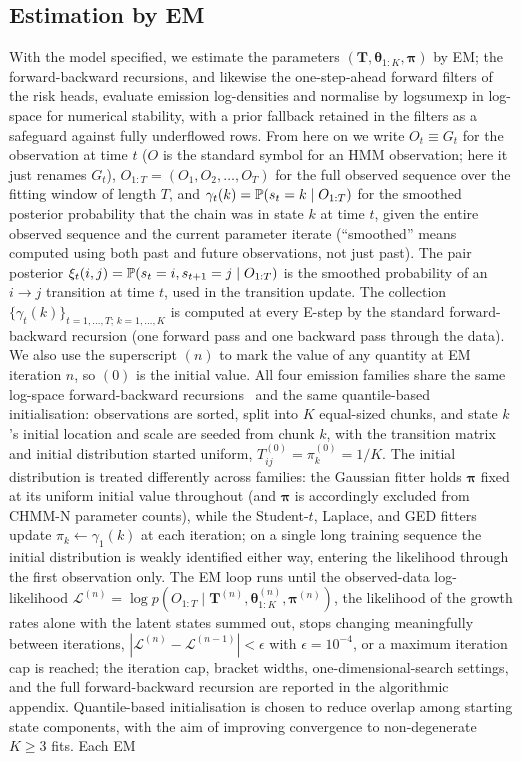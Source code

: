 \subsection{Estimation by EM}
\label{sec:estimation}

With the model specified, we estimate the parameters $(\mathbf{T}, \boldsymbol\theta_{1:K}, \boldsymbol\pi)$ by EM; the forward-backward recursions, and likewise the one-step-ahead forward filters of the risk heads, evaluate emission log-densities and normalise by logsumexp in log-space for numerical stability, with a prior fallback retained in the filters as a safeguard against fully underflowed rows. From here on we write $O_t \equiv G_t$ for the observation at time $t$ ($O$ is the standard symbol for an HMM observation; here it just renames $G_t$), $O_{1:T} = (O_1, O_2, \ldots, O_T)$ for the full observed sequence over the fitting window of length $T$, and $\gamma_t(k) = \mathbb{P}(s_t = k \mid O_{1:T})$ for the smoothed posterior probability that the chain was in state $k$ at time $t$, given the entire observed sequence and the current parameter iterate (``smoothed'' means computed using both past and future observations, not just past). The pair posterior $\xi_t(i, j) = \mathbb{P}(s_t = i, s_{t+1} = j \mid O_{1:T})$ is the smoothed probability of an $i \to j$ transition at time $t$, used in the transition update. The collection $\{\gamma_t(k)\}_{t=1,\ldots,T;\, k=1,\ldots,K}$ is computed at every E-step by the standard forward-backward recursion (one forward pass and one backward pass through the data). We also use the superscript $(n)$ to mark the value of any quantity at EM iteration $n$, so $(0)$ is the initial value. All four emission families share the same log-space forward-backward recursions~\cite{bilmes1998gentle} and the same quantile-based initialisation: observations are sorted, split into $K$ equal-sized chunks, and state $k$'s initial location and scale are seeded from chunk $k$, with the transition matrix and initial distribution started uniform, $T_{ij}^{(0)} = \pi_k^{(0)} = 1/K$. The initial distribution is treated differently across families: the Gaussian fitter holds $\boldsymbol\pi$ fixed at its uniform initial value throughout (and $\boldsymbol\pi$ is accordingly excluded from CHMM-N parameter counts), while the Student-$t$, Laplace, and GED fitters update $\pi_k \leftarrow \gamma_1(k)$ at each iteration; on a single long training sequence the initial distribution is weakly identified either way, entering the likelihood through the first observation only. The EM loop runs until the observed-data log-likelihood $\mathcal{L}^{(n)} = \log p(O_{1:T} \mid \mathbf{T}^{(n)}, \boldsymbol\theta_{1:K}^{(n)}, \boldsymbol\pi^{(n)})$, the likelihood of the growth rates alone with the latent states summed out, stops changing meaningfully between iterations, $|\mathcal{L}^{(n)} - \mathcal{L}^{(n-1)}| < \epsilon$ with $\epsilon = 10^{-4}$, or a maximum iteration cap is reached; the iteration cap, bracket widths, one-dimensional-search settings, and the full forward-backward recursion are reported in the algorithmic appendix. Quantile-based initialisation is chosen to reduce overlap among starting state components, with the aim of improving convergence to non-degenerate $K \ge 3$ fits. Each EM 